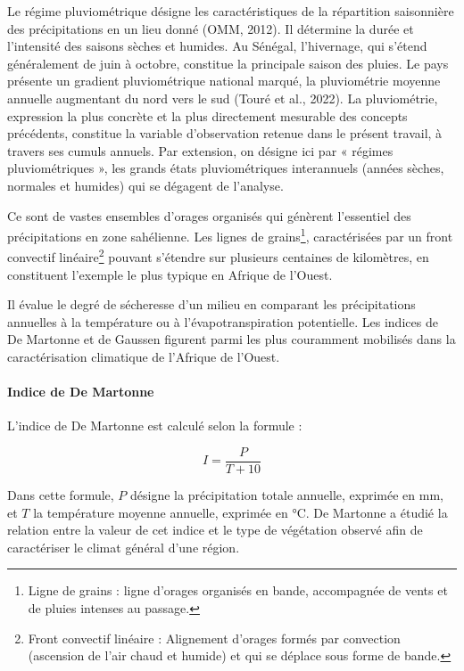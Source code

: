 Le régime pluviométrique désigne les caractéristiques de la répartition saisonnière des précipitations en un lieu donné (OMM, 2012). Il détermine la durée et l’intensité des saisons sèches et humides. Au Sénégal, l’hivernage, qui s’étend généralement de juin à octobre, constitue la principale saison des pluies. Le pays présente un gradient pluviométrique national marqué, la pluviométrie moyenne annuelle augmentant du nord vers le sud (Touré et al., 2022). La pluviométrie, expression la plus concrète et la plus directement mesurable des concepts précédents, constitue la variable d’observation retenue dans le présent travail, à travers ses cumuls annuels. Par extension, on désigne ici par « régimes pluviométriques », les grands états pluviométriques interannuels (années sèches, normales et humides) qui se dégagent de l’analyse.

Ce sont de vastes ensembles d'orages organisés qui génèrent l'essentiel des précipitations en zone sahélienne. Les lignes de grains\footnote{Ligne de grains : ligne d’orages organisés en bande, accompagnée de vents et de pluies intenses au passage.}, caractérisées par un front convectif linéaire\footnote{Front convectif linéaire : Alignement d’orages formés par convection (ascension de l’air chaud et humide) et qui se déplace sous forme de bande.} pouvant s'étendre sur plusieurs centaines de kilomètres, en constituent l'exemple le plus typique en Afrique de l'Ouest.

Il évalue le degré de sécheresse d’un milieu en comparant les précipitations annuelles à la température ou à l’évapotranspiration potentielle. Les indices de De Martonne et de Gaussen figurent parmi les plus couramment mobilisés dans la caractérisation climatique de l’Afrique de l’Ouest.

\paragraph{Indice de De Martonne}
L’indice de De Martonne est calculé selon la formule :

\begin{formulabox}[0.42\linewidth]{}
\[
I = \frac{P}{T+10}
\]
\end{formulabox}

Dans cette formule, $P$ désigne la précipitation totale annuelle, exprimée en mm, et $T$ la température moyenne annuelle, exprimée en °C. De Martonne a étudié la relation entre la valeur de cet indice et le type de végétation observé afin de caractériser le climat général d’une région.

